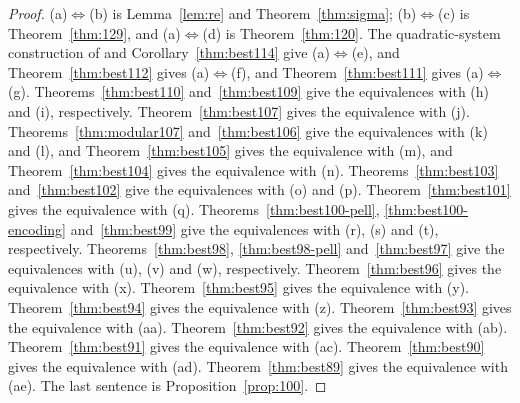 \documentclass[11pt,letterpaper]{article}
\theoremstyle{definition}
\theoremstyle{remark}
\numberwithin{equation}{section}
\begin{document}
\begin{proof}
(a)$\Leftrightarrow$(b) is Lemma~\ref{lem:re} and Theorem~\ref{thm:sigma};
(b)$\Leftrightarrow$(c) is Theorem~\ref{thm:129}, and
(a)$\Leftrightarrow$(d) is Theorem~\ref{thm:120}.
The quadratic-system construction of \cite[\S5]{J82} and
Corollary~\ref{thm:best114} give (a)$\Leftrightarrow$(e), and
Theorem~\ref{thm:best112} gives (a)$\Leftrightarrow$(f), and
Theorem~\ref{thm:best111} gives (a)$\Leftrightarrow$(g).
Theorems~\ref{thm:best110} and~\ref{thm:best109} give the equivalences
with (h) and (i), respectively. Theorem~\ref{thm:best107} gives the
equivalence with (j). Theorems~\ref{thm:modular107} and~\ref{thm:best106}
give the equivalences with (k) and (l), and
Theorem~\ref{thm:best105} gives the equivalence with (m), and
Theorem~\ref{thm:best104} gives the equivalence with (n).
Theorems~\ref{thm:best103} and~\ref{thm:best102} give the equivalences
with (o) and (p). Theorem~\ref{thm:best101} gives the equivalence with (q).
Theorems~\ref{thm:best100-pell}, \ref{thm:best100-encoding} and~\ref{thm:best99}
give the equivalences with (r), (s) and (t), respectively.
Theorems~\ref{thm:best98}, \ref{thm:best98-pell} and~\ref{thm:best97}
give the equivalences with (u), (v) and (w), respectively.
Theorem~\ref{thm:best96} gives the equivalence with (x).
Theorem~\ref{thm:best95} gives the equivalence with (y).
Theorem~\ref{thm:best94} gives the equivalence with (z).
Theorem~\ref{thm:best93} gives the equivalence with (aa).
Theorem~\ref{thm:best92} gives the equivalence with (ab).
Theorem~\ref{thm:best91} gives the equivalence with (ac).
Theorem~\ref{thm:best90} gives the equivalence with (ad).
Theorem~\ref{thm:best89} gives the equivalence with (ae).
The last sentence is
Proposition~\ref{prop:100}.
\end{proof}
\end{document}
